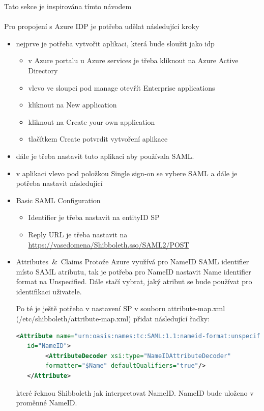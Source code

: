 Tato sekce je inspirována tímto návodem\cite{AzureTutorial}
\\
\\
Pro propojení s Azure IDP je potřeba udělat následující kroky
\begin{itemize}
    \item nejprve je potřeba vytvořit aplikaci, která bude sloužit jako idp
    \begin{itemize}
    \item v Azure portalu u Azure services je třeba kliknout na Azure Active Directory
    \item vlevo ve sloupci pod manage otevřít Enterprise applications
    \item kliknout na New application
    \item kliknout na Create your own application
    \item tlačítkem Create potvrdit vytvoření aplikace
    \end{itemize}
    \item dále je třeba nastavit tuto aplikaci aby používala SAML.
    \item v aplikaci vlevo pod položkou Single sign-on se vybere SAML a dále je potřeba nastavit následující
    \item Basic SAML Configuration
    \begin{itemize}
        \item Identifier je třeba nastavit na entityID SP
        \item Reply URL je třeba nastavit na \url{https://vasedomena/Shibboleth.sso/SAML2/POST}
    \end{itemize}
    \item \mbox{Attributes \& Claims} \linebreak
    Protože Azure využívá pro NameID SAML identifier místo SAML atributu, tak je potřeba pro NameID nastavit Name identifier format na Unspecified.
    Dále stačí vybrat, jaký atribut se bude používat pro identifikaci uživatele.
    
    Po té je ještě potřeba v nastavení SP v souboru attribute-map.xml (/etc/shibboleth/attribute-map.xml) přidat následující řadky:
    
\begin{lstlisting}[language=XML]
   <Attribute name="urn:oasis:names:tc:SAML:1.1:nameid-format:unspecified"
   id="NameID">
        <AttributeDecoder xsi:type="NameIDAttributeDecoder" 
        formatter="$Name" defaultQualifiers="true"/>
   </Attribute>
\end{lstlisting}
které řeknou Shibboleth jak interpretovat NameID. NameID bude uloženo v proměnné NameID.


\end{itemize}
